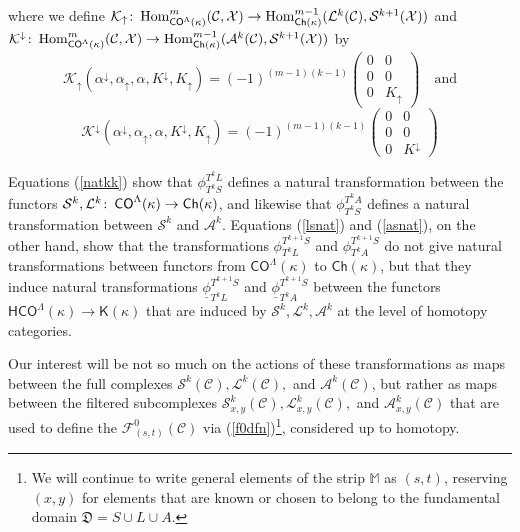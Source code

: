 \documentclass[11pt]{amsart}
\theoremstyle{definition}
\theoremstyle{remark}
\numberwithin{equation}{section}
\def\co{\colon\thinspace}
\def\uph{\underline{\phi}}
\begin{document}
where we define $\mathcal{K}_{\uparrow}\co \mathrm{Hom}^m_{\mathsf{CO}^{\Lambda}(\kappa)}(\mathcal{C},\mathcal{X})\to \mathrm{Hom}^{m-1}_{\mathsf{Ch}(\kappa)}(\mathcal{L}^k(\mathcal{C}),\mathcal{S}^{k+1}(\mathcal{X}))$ and  $\mathcal{K}^{\downarrow}\co \mathrm{Hom}^m_{\mathsf{CO}^{\Lambda}(\kappa)}(\mathcal{C},\mathcal{X})\to \mathrm{Hom}^{m-1}_{\mathsf{Ch}(\kappa)}(\mathcal{A}^k(\mathcal{C}),\mathcal{S}^{k+1}(\mathcal{X}))$
by \[ \mathcal{K}_{\uparrow}(\alpha^{\downarrow},\alpha_{\uparrow},\alpha,K^{\downarrow},K_{\uparrow})=(-1)^{(m-1)(k-1)}\left(\begin{array}{ccc} 0 & 0 \\ 0 & 0 \\ 0 & K_{\uparrow}\end{array}\right)\quad\mbox{and}\]\[ \mathcal{K}^{\downarrow}(\alpha^{\downarrow},\alpha_{\uparrow},\alpha,K^{\downarrow},K_{\uparrow})=(-1)^{(m-1)(k-1)}\left(\begin{array}{ccc} 0 & 0 \\ 0 & 0 \\ 0 & K^{\downarrow}\end{array}\right)\]

Equations (\ref{natkk}) show that $\phi_{T^kS}^{T^kL}$ defines a natural transformation between the functors $\mathcal{S}^k,\mathcal{L}^k\co \mathsf{CO}^{\Lambda}(\kappa)\to \mathsf{Ch}(\kappa)$, and likewise that $\phi_{T^kS}^{T^kA}$ defines a natural transformation between $\mathcal{S}^k$ and $\mathcal{A}^k$.  Equations (\ref{lsnat}) and (\ref{asnat}), on the other hand, show that the transformations $\phi_{T^kL}^{T^{k+1}S}$ and $\phi_{T^kA}^{T^{k+1}S}$  do not give natural transformations between functors from $\mathsf{CO}^{\Lambda}(\kappa)$ to $\mathsf{Ch}(\kappa)$,  but that they induce natural transformations $\uph_{T^kL}^{T^{k+1}S}$ and $\uph_{T^kA}^{T^{k+1}S}$ between the functors $\mathsf{HCO}^{\Lambda}(\kappa)\to \mathsf{K}(\kappa)$ that are induced by $\mathcal{S}^k,\mathcal{L}^k,\mathcal{A}^k$ at the level of homotopy categories.

Our interest will be not so much on the actions of these transformations as maps between the full complexes $\mathcal{S}^k(\mathcal{C}),\mathcal{L}^k(\mathcal{C}),$ and $\mathcal{A}^{k}(\mathcal{C})$, but rather as maps between the filtered subcomplexes $\mathcal{S}_{x,y}^{k}(\mathcal{C}),\mathcal{L}_{x,y}^{k}(\mathcal{C}),$ and $\mathcal{A}_{x,y}^{k}(\mathcal{C})$ that are used to define the $\mathcal{F}_{(s,t)}^{0}(\mathcal{C})$ via (\ref{f0dfn})\footnote{We will continue to write general elements of the strip $\mathbb{M}$ as $(s,t)$, reserving $(x,y)$ for elements that are known or chosen to belong to the fundamental domain $\mathfrak{D}=S\cup L\cup A$.}, considered up to homotopy.  
\end{document}
